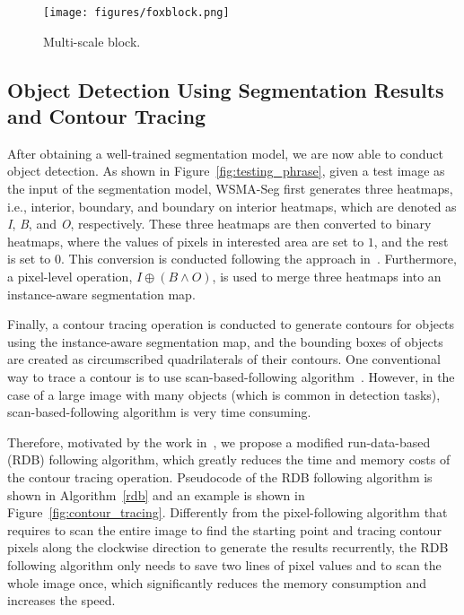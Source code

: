 \documentclass{article}
\begin{document}
\begin{figure}
  \centering
  \texttt{[image: figures/foxblock.png]}
  \caption{Multi-scale block.\label{fig:fox_block}}
\end{figure}



\subsection{Object Detection Using Segmentation Results and Contour Tracing}

After obtaining a well-trained segmentation model, we are now able to conduct object detection. As shown in Figure~\ref{fig:testing_phrase}, given a test image as the input of the segmentation model, WSMA-Seg first generates three heatmaps, i.e., interior, boundary, and boundary on interior heatmaps, which are denoted as \emph{I}, \emph{B}, and \emph{O}, respectively. These three heatmaps are then converted to binary heatmaps, where the values of pixels in interested area are set to $1$, and the rest is set to $0$. This conversion is conducted following the approach  in~\cite{suzuki1985topological}. Furthermore, a pixel-level operation, $I \oplus (B \wedge O)$, is used to merge three heatmaps into an instance-aware segmentation map. 

Finally, a contour tracing operation is conducted to generate contours for objects using the instance-aware segmentation map, and the bounding boxes of objects are created as circumscribed quadrilaterals of their contours. One conventional way to trace a contour is to use scan-based-following algorithm~\cite{suzuki1985topological}. However, in the case of a large image with many objects (which is common in detection tasks), scan-based-following algorithm is very time consuming.

Therefore, motivated by the work in~\cite{agrawala1977sequential}, we propose a modified run-data-based (RDB) following algorithm, which greatly reduces the time and memory costs of the contour tracing operation. 
Pseudocode of the RDB following algorithm is shown in Algorithm~\ref{rdb} and an example is shown in Figure~\ref{fig:contour_tracing}. Differently from the pixel-following algorithm that requires to scan the entire image to find the starting point and tracing contour pixels along the clockwise direction to generate the results recurrently, the RDB following algorithm only needs to save two lines of pixel values and to scan the whole image once, which significantly reduces the memory consumption and increases the speed.
\end{document}
